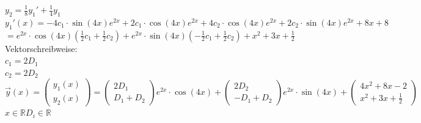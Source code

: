 \documentclass[fontset=ubuntu,12pt,a4paper,fleqn]{article}
\begin{document}
\begin{multicols}{2}
	\(y_2=\frac{1}{8}y_1'+\frac{1}{4}y_1\)\\
	\(y_1'(x)=-4c_1\cdot\sin(4x)e^{2x}+2c_1\cdot\cos(4x)e^{2x}+4c_2\cdot\cos(4x)e^{2x}+2c_2\cdot\sin(4x)e^{2x}+8x+8 \) \\
	\(=e^{2x}\cdot\cos(4x)(
	\frac{1}{2}c_1+\frac{1}{2}c_2
	)+e^{2x}\cdot\sin(4x)(
	-\frac{1}{2}c_1+\frac{1}{2}c_2
	)+x^2+3x+\frac{1}{2} \) \\
	Vektorschreibweise: \\
	\(c_1=2D_1\) \\
	\(c_2=2D_2\) \\
	\( \vec{y}(x)=\begin{pmatrix}
	y_1(x) \\ y_2(x)
	\end{pmatrix}=\begin{pmatrix}2D_1 \\ D_1+D_2 \end{pmatrix} e^{2x}\cdot\cos(4x)+\begin{pmatrix}2D_2 \\ -D_1+D_2 \end{pmatrix}e^{2x}\cdot\sin(4x) + \begin{pmatrix}4x^2+8x-2 \\ x^2+3x +\frac{1}{2} \end{pmatrix} \)\\\(x\in\mathbb{R} D_i\in\mathbb{R}\)
\end{multicols}
\end{document}
